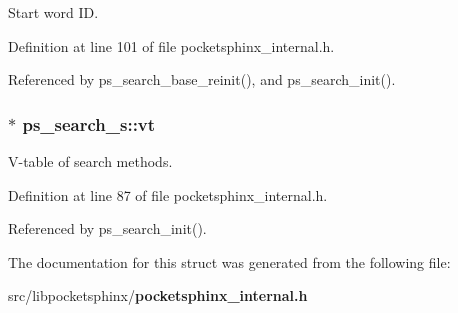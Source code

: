 \-Start word \-I\-D. 



\-Definition at line 101 of file pocketsphinx\-\_\-internal.\-h.



\-Referenced by ps\-\_\-search\-\_\-base\-\_\-reinit(), and ps\-\_\-search\-\_\-init().

\subsubsection[{vt}]{$\ast$ {\bf ps\-\_\-search\-\_\-s\-::vt}}\label{structps__search__s_aa51e88956bbe9c05359d32526180809b}


\-V-\/table of search methods. 



\-Definition at line 87 of file pocketsphinx\-\_\-internal.\-h.



\-Referenced by ps\-\_\-search\-\_\-init().



\-The documentation for this struct was generated from the following file\-:\begin{DoxyCompactItemize}
\item 
src/libpocketsphinx/{\bf pocketsphinx\-\_\-internal.\-h}\end{DoxyCompactItemize}
